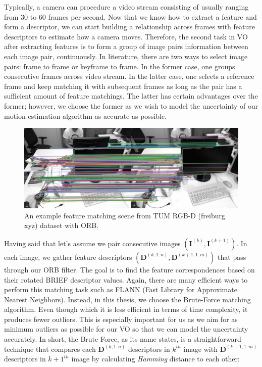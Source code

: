 \documentclass[12pt]{report}
\numberwithin{figure}{section}
\begin{document}
Typically, a camera can procedure a video stream consisting of 
usually ranging from 30 to 60 frames per second. 
Now that we know how to extract a feature and form a descriptor, 
we can start building a relationship across frames with feature descriptors to 
estimate how a camera 
moves. 
Therefore, the second task in VO after 
extracting features is to form a group of image pairs information between each 
image pair, continuously. In literature, there are two ways to select image 
pairs: frame to frame or keyframe to frame. In the former case, one groups 
consecutive frames across video stream. In the latter case, one selects a 
reference frame and keep matching it with subsequent frames as long as the 
pair has a sufficient amount of feature matchings. The latter has certain 
advantages over the former; however, we choose the former as we wish to model 
the uncertainty of our motion estimation algorithm as accurate as possible. 

\begin{figure}[H]
	\centering
	\includegraphics[width=\linewidth,natwidth=640,natheight=640]
	{fig/ref_imgs/covo_matches.png}
	\caption[ORB Feature Mathces]
	{An example feature matching scene from 
	TUM RGB-D (freiburg xyz) dataset with ORB.}
	\label{fig:feature_matchings}
\end{figure}

Having said that let's assume we pair consecutive images $(\mathbf{I}^{(k)}, 
\mathbf{I}^{(k+1)})$. In each image, we gather feature descriptors 
$(\mathbf{D}^{(k,1:n)}, \mathbf{D}^{(k+1,1:m)})$ that pass through our ORB 
filter. The goal is to find the feature correspondences based on their rotated 
BRIEF descriptor values. Again, there are many efficient ways to perform this 
matching task such as FLANN (Fast Library for Approximate Nearest Neighbors). 
Instead, in this thesis, we choose the Brute-Force matching algorithm.
Even though which it is less efficient in terms of time complexity, it 
produces fewer outliers. This is especially important for us as we aim for as 
minimum outliers as possible for our VO so that we can model the uncertainty 
accurately. 
In short, the Brute-Force, as its name states, is a straightforward technique 
that 
compares each $\mathbf{D}^{(k,1:n)}$ descriptors in $k^{th}$ image with 
$\mathbf{D}^{(k+1,1:m)}$ descriptors in $k+1^{th}$ image by calculating 
\textit{Hamming} distance to each other:
\end{document}
